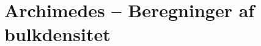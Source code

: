  \clearpage
 \FloatBlock
 \chapter{Archimedes -- Beregninger af bulkdensitet }
 

% 

% 
%
% 
%
% 

% 

% 

% 

